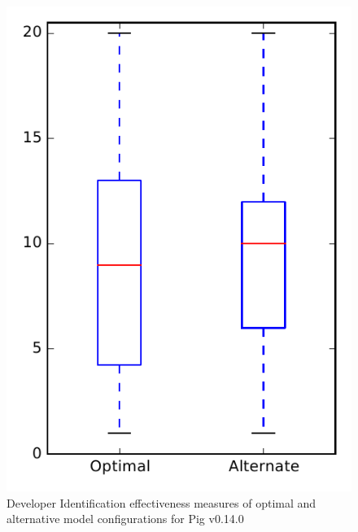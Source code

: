 
\begin{figure}
\centering
\includegraphics[height=0.4\textheight]{figures/combo/dit_rq1_pig}
\caption{Developer Identification effectiveness measures of optimal and alternative model configurations for Pig v0.14.0}
\label{fig:combo:dit:rq1:pig}
\end{figure}
